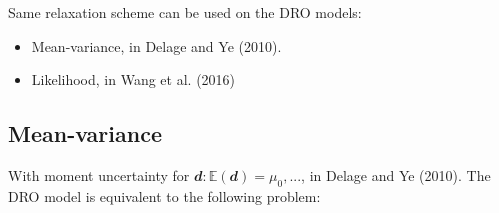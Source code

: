 \documentclass[
  a4paper,
,tablecaptionabove
]{scrartcl}
\numberwithin{equation}{section}
\providecommand{\tightlist}{%
  \setlength{\itemsep}{0pt}\setlength{\parskip}{0pt}}
\begin{document}
Same relaxation scheme can be used on the DRO models:

\begin{itemize}
  \tightlist
  \item
        Mean-variance, in Delage and Ye (2010).
  \item
        Likelihood, in Wang et al. (2016)
\end{itemize}

\hypertarget{mean-variance}{%
  \subsection{Mean-variance}\label{mean-variance}}

With moment uncertainty for
\(\mathbfit d: \mathbb{E}(\mathbfit d) = \mu_0, ...\), in Delage and
Ye (2010). The DRO model is equivalent to the following problem:
\end{document}
